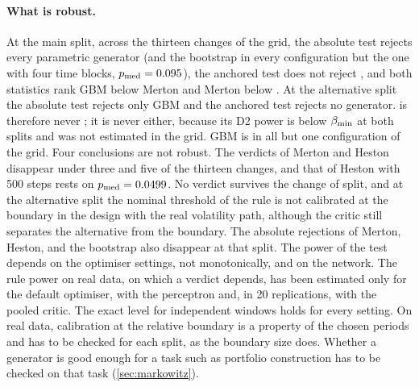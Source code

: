 \paragraph{What is robust.}
At the main split, across the thirteen changes of the grid, the absolute \WC{} test rejects every
parametric generator (and the bootstrap in every configuration but the one with four time blocks,
$p_{\mathrm{med}}=0.095$), the anchored test does not reject \GARCHt{}, and both statistics rank GBM below
Merton and Merton below \GARCHt. At the alternative split the absolute \WC{} test rejects only GBM
and the anchored test rejects no generator. \GARCHt{} is therefore never \BAD{}; it is never
\GOOD{} either, because its D2 power is below $\beta_{\min}$ at both splits and was not estimated in the
grid. GBM is \BAD{} in all but one configuration of the grid. Four conclusions are not robust. The
\BAD{} verdicts of Merton and Heston disappear under three and five of the thirteen changes, and
that of Heston with 500 steps rests on $p_{\mathrm{med}}=0.0499$. No \BAD{} verdict survives the change of
split, and at the alternative split the nominal threshold of the rule is not calibrated at the
boundary in the design with the real volatility path, although the critic still separates the
alternative from the boundary. The absolute rejections of Merton, Heston, \GARCHt{} and the
bootstrap also disappear at that split. The power of the \WC{} test depends on the optimiser
settings, not monotonically, and on the network. The rule power on real data, on which a \GOOD{}
verdict depends, has been estimated only for the default optimiser, with the perceptron and, in
20 replications, with the pooled critic. The exact level for independent windows holds for every
setting. On real data, calibration at the relative boundary is a
property of the chosen periods and has to be checked for each split, as the boundary size does.
Whether a generator is good enough for a task such as portfolio construction has to be checked
on that task (\cref{sec:markowitz}).

